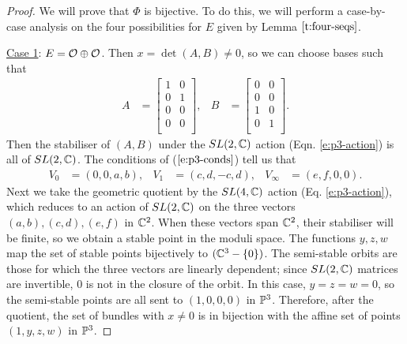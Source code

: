 	\begin{proof}
	 	We will prove that $\Phi$ is bijective. To do this, we will perform a case-by-case analysis on the four possibilities for $E$ given by Lemma $\ref{t:four-seqs}$.
		
		\underline{Case 1}: $E = \mathcal{O}\oplus \mathcal{O}$. Then $x = \det(A,B) \neq 0$, so we can choose bases such that
		\begin{align*}
			A &= \begin{bmatrix}
			1 & 0\\
			0 & 1\\
			0 & 0\\
			0 & 0\\
			\end{bmatrix}, & 
			B &= \begin{bmatrix}
			0 & 0\\
			0 & 0\\
			1 & 0\\
			0 & 1\\
			\end{bmatrix}.
		\end{align*}
		Then the stabiliser of $(A,B)$ under the $SL(2,\mathbb{C})$ action (Eqn. \ref{e:p3-action}) is all of $SL(2,\mathbb{C})$. The conditions of ($\ref{e:p3-conds}$) tell us that 
		\begin{align}
			V_0 &= (0,0,a,b), & V_1 &= (c,d,-c,d), & V_\infty &=(e,f,0,0).
		\end{align}
		Next we take the geometric quotient by the $SL(4,\mathbb{C})$ action (Eq. \ref{e:p3-action}), which reduces to an action of $SL(2,\mathbb{C})$ on the three vectors $(a,b),(c,d),(e,f)$ in $\mathbb{C}^2$. When these vectors span $\mathbb{C}^2$, their stabiliser will be finite, so we obtain a stable point in the moduli space. The functions $y,z,w$ map the set of stable points bijectively to $(\mathbb{C}^3 - \{0\})$. The semi-stable orbits are those for which the three vectors are linearly dependent; since $SL(2,\mathbb{C})$ matrices are invertible, $0$ is not in the closure of the orbit. In this case, $y = z = w = 0$, so the semi-stable points are all sent to $(1,0,0,0)$ in $\mathbb{P}^3$. Therefore, after the quotient, the set of bundles with $x \neq 0$ is in bijection with the affine set of points $(1,y,z,w)$ in $\mathbb{P}^3$.
		

\end{proof}
